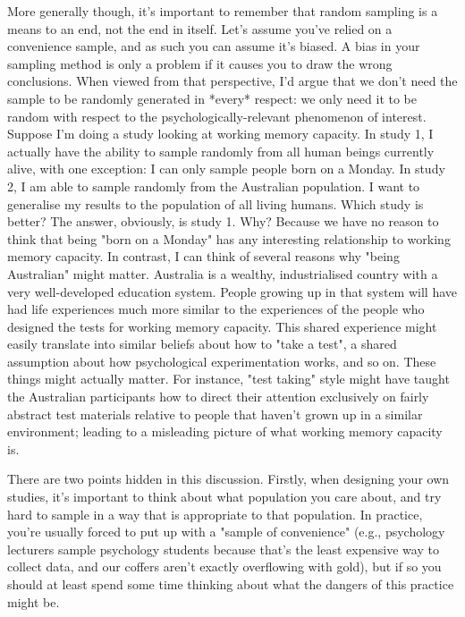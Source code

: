 More generally though, it's important to remember that random sampling is a means to an end, not the end in itself. Let's assume you've relied on a convenience sample, and as such you can assume it's biased. A bias in your sampling method is only a problem if it causes you to draw the wrong conclusions. When viewed from that perspective, I'd argue that we don't need the sample to be randomly generated in *every* respect: we only need it to be random with respect to the psychologically-relevant phenomenon of interest. Suppose I'm doing a study looking at working memory capacity. In study 1, I actually have the ability to sample randomly from all human beings currently alive, with one exception: I can only sample people born on a Monday. In study 2, I am able to sample randomly from the Australian population. I want to generalise my results to the population of all living humans. Which study is better? The answer, obviously, is study 1. Why? Because we have no reason to think that being "born on a Monday" has any interesting relationship to working memory capacity. In contrast, I can think of several reasons why "being Australian" might matter. Australia is a wealthy, industrialised country with a very well-developed education system. People growing up in that system will have had life experiences much more similar to the experiences of the people who designed the tests for working memory capacity. This shared experience might easily translate into similar beliefs about how to "take a test", a shared assumption about how psychological experimentation works, and so on. These things might actually matter. For instance, "test taking" style might have taught the Australian participants how to direct their attention exclusively on fairly abstract test materials relative to people that haven't grown up in a similar environment; leading to a misleading picture of what working memory capacity is. 

There are two points hidden in this discussion. Firstly, when designing your own studies, it's important to think about what population you care about, and try hard to sample in a way that is appropriate to that population. In practice, you're usually forced to put up with a "sample of convenience" (e.g., psychology lecturers sample psychology students because that's the least expensive way to collect data, and our coffers aren't exactly overflowing with gold), but if so you should at least spend some time thinking about what the dangers of this practice might be.

